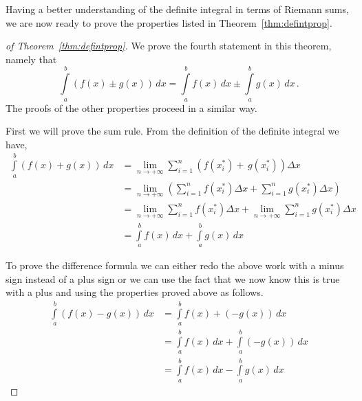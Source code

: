 \ifanalysis

Having  a better understanding of the definite integral in terms of Riemann sums, we are now ready to prove the properties listed in Theorem~\ref{thm:defintprop}.

\begin{proof}[of Theorem~\ref{thm:defintprop}]
We prove the fourth statement in this theorem, namely that
$$
\displaystyle\int\limits_{{\,a}}^{{\,b}}{{\left(f\left( x \right) \pm g\left( x \right) \right)\,dx}} = \int\limits_{{\,a}}^{{\,b}}{{f\left( x \right)\,dx}} \pm \int\limits_{{\,a}}^{{\,b}}{{g\left( x \right)\,dx}}\,.
$$
The proofs of the other properties proceed in a similar way. 

First we will prove the sum rule. From the definition of the definite integral we have,
\allowdisplaybreaks
\begin{align*}
\int\limits_{{\,a}}^{{\,b}}{{\left(f\left( x \right) + g\left( x \right)\right)\,dx}} & = \mathop {\lim }\limits_{n \to +\infty } \sum\limits_{i = 1}^n {\left( {f\left( {x_i^*} \right) + \,g\left( {x_i^*} \right)} \right)\Delta x} \\ &  = \mathop {\lim }\limits_{n \to +\infty } \left( {\sum\limits_{i = 1}^n {f\left( {x_i^*} \right)\Delta x}  + \sum\limits_{i = 1}^n {g\left( {x_i^*} \right)\Delta x} } \right)\\ &  = \mathop {\lim }\limits_{n \to +\infty } \sum\limits_{i = 1}^n {f\left( {x_i^*} \right)\Delta x}  + \mathop {\lim }\limits_{n \to +\infty } \sum\limits_{i = 1}^n {g\left( {x_i^*} \right)\Delta x} \\ &  = \int\limits_{{\,a}}^{{\,b}}{{f\left( x \right)\,dx}} + \int\limits_{{\,a}}^{{\,b}}{{g\left( x \right)\,dx}}
\end{align*}

To prove the difference formula we can either redo the above work with a minus sign instead of a plus sign or we can use the fact that we now know this is true with a plus and using the properties proved above as follows.
\begin{align*}
\int\limits_{{\,a}}^{{\,b}}{{\left(f\left( x \right) - g\left( x \right)\right)\,dx}} & = \int\limits_{{\,a}}^{{\,b}}{{f\left( x \right) + \left( { - g\left( x \right)} \right)\,dx}}\\ &  = \int\limits_{{\,a}}^{{\,b}}{{f\left( x \right)\,dx}} + \int\limits_{{\,a}}^{{\,b}}{{\left( { - g\left( x \right)} \right)\,dx}}\\ &  = \int\limits_{{\,a}}^{{\,b}}{{f\left( x \right)\,dx}} - \int\limits_{{\,a}}^{{\,b}}{{g\left( x \right)\,dx}}\end{align*}
\end{proof}

